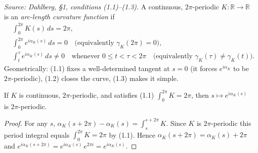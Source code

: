 \begin{definition}


  \label{def:arclength_curvature}
  \textit{Source: Dahlberg, §1, conditions (1.1)--(1.3).}
  A continuous, $2\pi$-periodic $K : \mathbb{R}\to\mathbb{R}$ is an
  \emph{arc-length curvature function} if
  \begin{align}
    \tag{1.1} & \int_0^{2\pi} K(s)\,ds = 2\pi, \\
    \tag{1.2} & \int_0^{2\pi} e^{i\alpha_K(s)}\,ds = 0
       \quad\bigl(\text{equivalently } \gamma_K(2\pi)=0\bigr), \\
    \tag{1.3} & \int_t^\tau e^{i\alpha_K(s)}\,ds \neq 0
       \quad\text{whenever } 0 \le t < \tau < 2\pi
       \quad\bigl(\text{equivalently } \gamma_K(\tau)\neq\gamma_K(t)\bigr).
  \end{align}
  Geometrically: (1.1) fixes a well-determined tangent at $s=0$ (it forces
  $e^{i\alpha_K}$ to be $2\pi$-periodic), (1.2) closes the curve, (1.3) makes it
  simple.
\end{definition}

\begin{lemma}


  \label{lem:eiangle_periodic}
  If $K$ is continuous, $2\pi$-periodic, and satisfies (1.1)
  $\int_0^{2\pi}K=2\pi$, then $s\mapsto e^{i\alpha_K(s)}$ is $2\pi$-periodic.
\end{lemma}
\begin{proof}
  \leanok
  For any $s$, $\alpha_K(s+2\pi)-\alpha_K(s)=\int_s^{s+2\pi}K$. Since $K$ is
  $2\pi$-periodic this period integral equals $\int_0^{2\pi}K=2\pi$ by (1.1).
  Hence $\alpha_K(s+2\pi)=\alpha_K(s)+2\pi$ and $e^{i\alpha_K(s+2\pi)}=
  e^{i\alpha_K(s)}\,e^{2\pi i}=e^{i\alpha_K(s)}$.
\end{proof}

